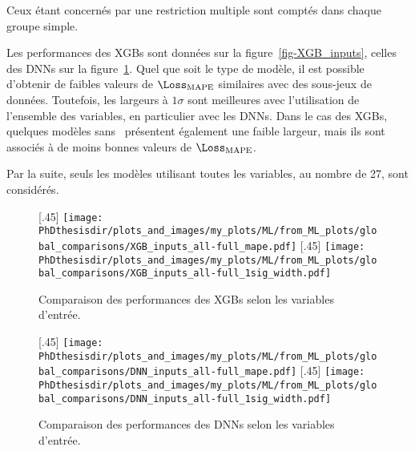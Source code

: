 Ceux étant concernés par une restriction multiple sont comptés dans chaque groupe simple.
\par
Les performances des XGBs sont données sur la figure~\ref{fig-XGB_inputs}, celles des DNNs sur la figure~\ref{fig-DNN_inputs}.
Quel que soit le type de modèle,
il est possible d'obtenir de faibles valeurs de $\Loss_\text{MAPE}$ similaires avec des sous-jeux de données.
Toutefois, les largeurs à $1\sigma$ sont meilleures avec l'utilisation de l'ensemble des variables, en particulier avec les DNNs.
Dans le cas des XGBs, quelques modèles sans \mT\ présentent également une faible largeur, mais ils sont associés à de moins bonnes valeurs de $\Loss_\text{MAPE}$.
\par
Par la suite, seuls les modèles utilisant toutes les variables, au nombre de 27, sont considérés.
\begin{figure}[p]
\centering

\subcaptionbox{}[.45\textwidth]
{\texttt{[image: \\PhDthesisdir/plots\_and\_images/my\_plots/ML/from\_ML\_plots/global\_comparisons/XGB\_inputs\_all-full\_mape.pdf]}\vspace{-\baselineskip}}
\hfill
\subcaptionbox{}[.45\textwidth]
{\texttt{[image: \\PhDthesisdir/plots\_and\_images/my\_plots/ML/from\_ML\_plots/global\_comparisons/XGB\_inputs\_all-full\_1sig\_width.pdf]}\vspace{-\baselineskip}}

\caption{Comparaison des performances des XGBs selon les variables d'entrée.}
\label{fig-XGB_inputs}

\subcaptionbox{}[.45\textwidth]
{\texttt{[image: \\PhDthesisdir/plots\_and\_images/my\_plots/ML/from\_ML\_plots/global\_comparisons/DNN\_inputs\_all-full\_mape.pdf]}\vspace{-\baselineskip}}
\hfill
\subcaptionbox{}[.45\textwidth]
{\texttt{[image: \\PhDthesisdir/plots\_and\_images/my\_plots/ML/from\_ML\_plots/global\_comparisons/DNN\_inputs\_all-full\_1sig\_width.pdf]}\vspace{-\baselineskip}}

\caption{Comparaison des performances des DNNs selon les variables d'entrée.}
\label{fig-DNN_inputs}
\end{figure}
\clearpage
